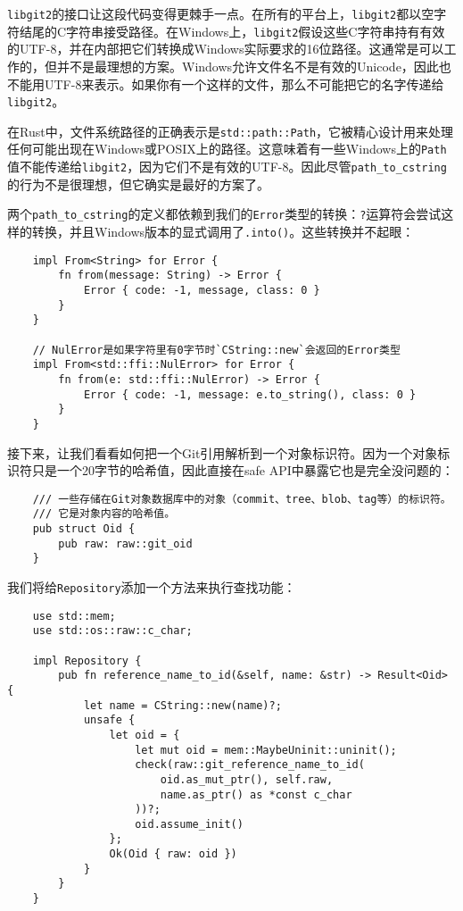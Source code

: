 \texttt{libgit2}的接口让这段代码变得更棘手一点。在所有的平台上，\texttt{libgit2}都以空字符结尾的C字符串接受路径。在Windows上，\texttt{libgit2}假设这些C字符串持有有效的UTF-8，并在内部把它们转换成Windows实际要求的16位路径。这通常是可以工作的，但并不是最理想的方案。Windows允许文件名不是有效的Unicode，因此也不能用UTF-8来表示。如果你有一个这样的文件，那么不可能把它的名字传递给\texttt{libgit2}。

在Rust中，文件系统路径的正确表示是\texttt{std::path::Path}，它被精心设计用来处理任何可能出现在Windows或POSIX上的路径。这意味着有一些Windows上的\texttt{Path}值不能传递给\texttt{libgit2}，因为它们不是有效的UTF-8。因此尽管\texttt{path\_to\_cstring}的行为不是很理想，但它确实是最好的方案了。

两个\texttt{path\_to\_cstring}的定义都依赖到我们的\texttt{Error}类型的转换：\texttt{?}运算符会尝试这样的转换，并且Windows版本的显式调用了\texttt{.into()}。这些转换并不起眼：
\begin{verbatim}
    impl From<String> for Error {
        fn from(message: String) -> Error {
            Error { code: -1, message, class: 0 }
        }
    }

    // NulError是如果字符里有0字节时`CString::new`会返回的Error类型
    impl From<std::ffi::NulError> for Error {
        fn from(e: std::ffi::NulError) -> Error {
            Error { code: -1, message: e.to_string(), class: 0 }
        }
    }
\end{verbatim}

接下来，让我们看看如何把一个Git引用解析到一个对象标识符。因为一个对象标识符只是一个20字节的哈希值，因此直接在safe API中暴露它也是完全没问题的：
\begin{verbatim}
    /// 一些存储在Git对象数据库中的对象（commit、tree、blob、tag等）的标识符。
    /// 它是对象内容的哈希值。
    pub struct Oid {
        pub raw: raw::git_oid
    }
\end{verbatim}

我们将给\texttt{Repository}添加一个方法来执行查找功能：
\begin{verbatim}
    use std::mem;
    use std::os::raw::c_char;

    impl Repository {
        pub fn reference_name_to_id(&self, name: &str) -> Result<Oid> {
            let name = CString::new(name)?;
            unsafe {
                let oid = {
                    let mut oid = mem::MaybeUninit::uninit();
                    check(raw::git_reference_name_to_id(
                        oid.as_mut_ptr(), self.raw,
                        name.as_ptr() as *const c_char
                    ))?;
                    oid.assume_init()
                };
                Ok(Oid { raw: oid })
            }
        }
    }
\end{verbatim}

